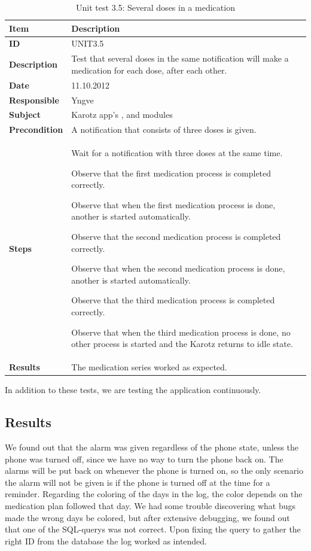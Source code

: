 \begin{table}
	\begin{center}
		\begin{tabular}{|p{3.0cm}|p{14.0cm}|}
			\hline
			\bf{Item} & \bf{Description}\\
			\hline
			\bf{ID} & UNIT3.5\\
			\bf{Description} & Test that several doses in the same notification will make a medication for each dose, after each other.\\
			\bf{Date} & 11.10.2012\\
			\bf{Responsible} & Yngve\\
			\bf{Subject} & Karotz app's \code{Repository}, \code{Notification} and \code{Medication} modules\\
			\bf{Precondition} & A notification that consists of three doses is given. \\
			\bf{Steps} &
			\begin{tabulenum}
				\item Wait for a notification with three doses at the same time.
				\item Observe that the first medication process is completed correctly.
				\item Observe that when the first medication process is done, another is started automatically.
				\item Observe that the second medication process is completed correctly.
				\item Observe that when the second medication process is done, another is started automatically.
				\item Observe that the third medication process is completed correctly.
				\item Observe that when the third medication process is done, no other process is started and the Karotz returns to idle state.
			\end{tabulenum}\\
			\hline
			\bf{Results} & The medication series worked as expected. \\
			\hline
		\end{tabular}
	\end{center}
	\caption{Unit test 3.5: Several doses in a medication}
	\label{tab:unit3.5}
\end{table}

In addition to these tests, we are testing the application continuously.
\subsection{Results}
We found out that the alarm was given regardless of the phone state, unless the phone was turned off, since we have
no way to turn the phone back on. The alarms will be put back on whenever the phone is turned on, so the only scenario
the alarm will not be given is if the phone is turned off at the time for a reminder.
Regarding the coloring of the days in the log, the color depends on the medication plan followed that day. We had some trouble
discovering what bugs made the wrong days be colored, but after extensive debugging, we found out that one of the SQL-querys was not correct. Upon fixing the query to gather the right ID from the database the log worked as intended.

